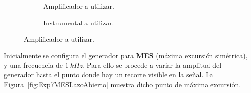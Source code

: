       \begin{figure}[H]
        \centering
        \begin{subfigure}[H]{0.48\textwidth}
          \caption{Amplificador a utilizar.}
          \label{fig:Exp7Amplificador}
        \end{subfigure}
        \hfill 
        \begin{subfigure}[H]{0.48\textwidth}
          \caption{Instrumental a utilizar.}
          \label{fig:Exp7Instrumental}
        \end{subfigure} 

          \caption{Amplificador a utilizar.}
          \label{fig:Exp7Circuito}
      \end{figure} 

    Inicialmente se configura el generador para \textbf{MES} (máxima excursión simétrica), y 
    una frecuencia de $1~kHz$. Para ello se procede a variar la amplitud del generador hasta 
    el punto donde hay un recorte visible en la señal. La Figura~\ref{fig:Exp7MESLazoAbierto} 
    muestra dicho punto de máxima excursión.

